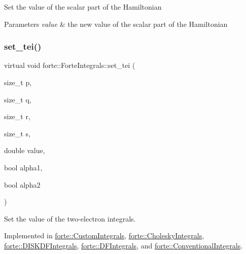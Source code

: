 Set the value of the scalar part of the Hamiltonian 
\begin{DoxyParams}{Parameters}
{\em value} & the new value of the scalar part of the Hamiltonian \\
\hline
\end{DoxyParams}
\mbox{\label{classforte_1_1_forte_integrals_aaccd56e90bbc3c423158efb154336b9c}} 
\subsubsection{\texorpdfstring{set\+\_\+tei()}{set\_tei()}}
{\footnotesize\ttfamily virtual void forte\+::\+Forte\+Integrals\+::set\+\_\+tei (\begin{DoxyParamCaption}\item[{size\+\_\+t}]{p,  }\item[{size\+\_\+t}]{q,  }\item[{size\+\_\+t}]{r,  }\item[{size\+\_\+t}]{s,  }\item[{double}]{value,  }\item[{bool}]{alpha1,  }\item[{bool}]{alpha2 }\end{DoxyParamCaption})\hspace{0.3cm}{\ttfamily [pure virtual]}}



Set the value of the two-\/electron integrals. 



Implemented in \mbox{\hyperlink{classforte_1_1_custom_integrals_ab9b7fd99d359eedcde4fcbf5e5df1795}{forte\+::\+Custom\+Integrals}}, \mbox{\hyperlink{classforte_1_1_cholesky_integrals_a1db39bcdf9fd78a15ca3d1448bd08c5f}{forte\+::\+Cholesky\+Integrals}}, \mbox{\hyperlink{classforte_1_1_d_i_s_k_d_f_integrals_aceee5961cd70cfc7fc9b7799675f8fb6}{forte\+::\+D\+I\+S\+K\+D\+F\+Integrals}}, \mbox{\hyperlink{classforte_1_1_d_f_integrals_ac623714d6a85c8f18722aae187b8324e}{forte\+::\+D\+F\+Integrals}}, and \mbox{\hyperlink{classforte_1_1_conventional_integrals_aef0130cb53212f32652a56e83e204519}{forte\+::\+Conventional\+Integrals}}.

\mbox{\label{classforte_1_1_forte_integrals_afe2d1f8b866b95bd3c299e5d7d0ca2db}} 

